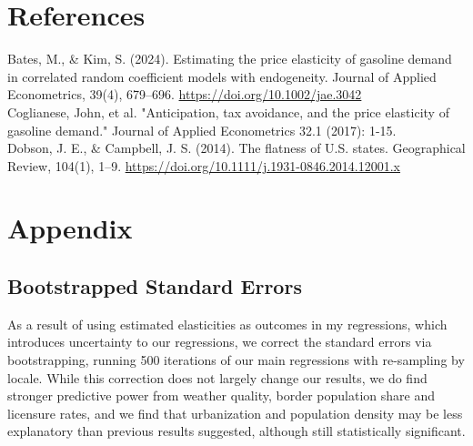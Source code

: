 \documentclass[12pt,a4paper]{article}
\begin{document}
\section{References}
Bates, M., \& Kim, S. (2024). Estimating the price elasticity of gasoline demand in correlated random coefficient models with endogeneity. Journal of Applied Econometrics, 39(4), 679–696. \url{https://doi.org/10.1002/jae.3042} \\

Coglianese, John, et al. "Anticipation, tax avoidance, and the price elasticity of gasoline demand." Journal of Applied Econometrics 32.1 (2017): 1-15. \\

Dobson, J. E., \& Campbell, J. S. (2014). The flatness of U.S. states. Geographical Review, 104(1), 1–9. \url{https://doi.org/10.1111/j.1931-0846.2014.12001.x} 

\newpage
\section{Appendix}

\subsection{Bootstrapped Standard Errors}
As a result of using estimated elasticities as outcomes in my regressions, which introduces uncertainty to our regressions, we correct the standard errors via bootstrapping, running 500 iterations of our main regressions with re-sampling by locale. While this correction does not largely change our results, we do find stronger predictive power from weather quality, border population share and licensure rates, and we find that urbanization and population density may be less explanatory than previous results suggested, although still statistically significant. \\

\begin{table}[H]
	\begin{center}
		
		\label{main_estimates_w_boot}
		\caption[Bootstrap-Corrected Main Predictor Estimates, Weighted]{Using bootstrap-corrected standard errors, we find similar significance for the estimates in columns (1), (2), (3), and (5), while population density becomes less statistically significant, and the weather index becomes the most explanatory in the full regression with all 5 predictors.}
	\end{center}
\end{table}
\end{document}
